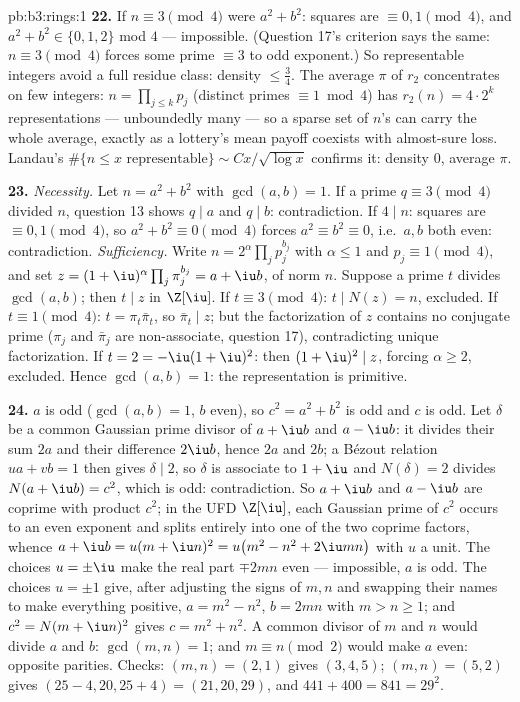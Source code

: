 \begin{solution}{pb:b3:rings:1}
\textbf{22.} If $n \equiv 3 \pmod4$ were $a^2 + b^2$: squares
are $\equiv 0, 1 \pmod 4$, and $a^2 + b^2 \in \{0, 1, 2\}$
mod $4$ --- impossible. (Question 17's criterion says the
same: $n \equiv 3 \pmod 4$ forces some prime $\equiv 3$ to odd
exponent.) So representable integers avoid a full residue
class: density $\leq \frac34$. The average $\pi$ of $r_2$
concentrates on few integers: $n = \prod_{j\leq k}p_j$
(distinct primes $\equiv 1 \bmod 4$) has $r_2(n) = 4\cdot2^k$
representations --- unboundedly many --- so a sparse set of
$n$'s can carry the whole average, exactly as a lottery's mean
payoff coexists with almost-sure loss. Landau's
$\#\{n \leq x \text{ representable}\} \sim
Cx/\sqrt{\log x}$ confirms it: density $0$, average $\pi$.

\textbf{23.} \emph{Necessity.} Let $n = a^2 + b^2$ with
$\gcd(a, b) = 1$. If a prime $q \equiv 3 \pmod 4$ divided $n$,
question 13 shows $q \mid a$ and $q \mid b$: contradiction. If
$4 \mid n$: squares are $\equiv 0, 1 \pmod 4$, so $a^2 + b^2
\equiv 0 \pmod 4$ forces $a^2 \equiv b^2 \equiv 0$, i.e.\ $a,
b$ both even: contradiction. \emph{Sufficiency.} Write $n =
2^{\alpha}\prod_jp_j^{b_j}$ with $\alpha \leq 1$ and $p_j
\equiv 1 \pmod 4$, and set $z = (1+\iu)^{\alpha}\prod_j
\pi_j^{b_j} = a + \iu b$, of norm $n$. Suppose a prime $t$
divides $\gcd(a, b)$; then $t \mid z$ in $\Z[\iu]$. If $t
\equiv 3 \pmod 4$: $t \mid N(z) = n$, excluded. If $t \equiv 1
\pmod 4$: $t = \pi_t\bar\pi_t$, so $\bar\pi_t \mid z$; but the
factorization of $z$ contains no conjugate prime ($\pi_j$ and
$\bar\pi_j$ are non-associate, question 17), contradicting
unique factorization. If $t = 2 = -\iu(1+\iu)^2$: then
$(1+\iu)^2 \mid z$, forcing $\alpha \geq 2$, excluded. Hence
$\gcd(a, b) = 1$: the representation is primitive.

\textbf{24.} $a$ is odd ($\gcd(a, b) = 1$, $b$ even), so $c^2
= a^2 + b^2$ is odd and $c$ is odd. Let $\delta$ be a common
Gaussian prime divisor of $a + \iu b$ and $a - \iu b$: it
divides their sum $2a$ and their difference $2\iu b$, hence
$2a$ and $2b$; a B\'ezout relation $ua + vb = 1$ then gives
$\delta \mid 2$, so $\delta$ is associate to $1 + \iu$ and
$N(\delta) = 2$ divides $N(a + \iu b) = c^2$, which is odd:
contradiction. So $a + \iu b$ and $a - \iu b$ are coprime with
product $c^2$; in the UFD $\Z[\iu]$, each Gaussian prime of
$c^2$ occurs to an even exponent and splits entirely into one
of the two coprime factors, whence $a + \iu b = u(m + \iu
n)^2 = u\bigl(m^2 - n^2 + 2\iu mn\bigr)$ with $u$ a unit. The
choices $u = \pm\iu$ make the real part $\mp 2mn$ even ---
impossible, $a$ is odd. The choices $u = \pm1$ give, after
adjusting the signs of $m, n$ and swapping their names to make
everything positive, $a = m^2 - n^2$, $b = 2mn$ with $m > n
\geq 1$; and $c^2 = N(m + \iu n)^2$ gives $c = m^2 + n^2$. A
common divisor of $m$ and $n$ would divide $a$ and $b$: $\gcd
(m, n) = 1$; and $m \equiv n \pmod 2$ would make $a$ even:
opposite parities. Checks: $(m, n) = (2, 1)$ gives $(3, 4,
5)$; $(m, n) = (5, 2)$ gives $(25 - 4, 20, 25 + 4) = (21, 20,
29)$, and $441 + 400 = 841 = 29^2$.


\end{solution}
